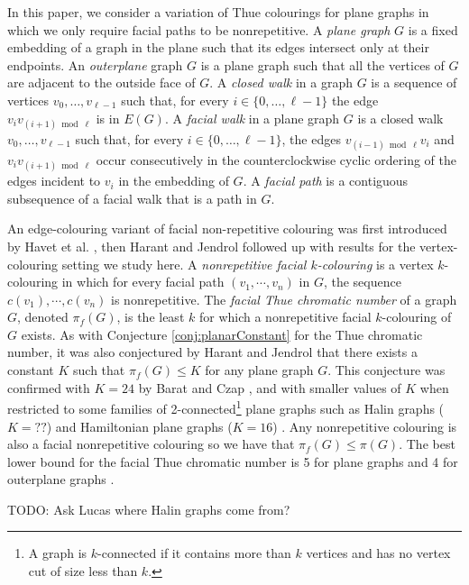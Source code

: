 \documentclass{patmorin}
\begin{document}
In this paper, we consider a variation of Thue colourings
for plane graphs in which we only require facial paths to be
nonrepetitive.
A \emph{plane graph} $G$ is a fixed embedding of a graph in the plane such that its edges intersect only at their endpoints. An \emph{outerplane} graph $G$ is a plane graph such that all the vertices of $G$ are adjacent to the outside face of $G$. 
A \emph{closed walk} in a graph $G$ is a sequence of vertices $v_0,\ldots,v_{\ell-1}$ such that, for every $i\in\{0,\ldots,\ell-1\}$ the edge $v_iv_{(i+1)\bmod \ell}$ is in $E(G)$.
A \emph{facial walk} in a plane graph $G$ is a closed walk
$v_0,\ldots,v_{\ell-1}$ such that, for every $i\in\{0,\ldots,\ell-1\}$,
the edges $v_{(i-1)\bmod \ell} v_i$ and $v_iv_{(i+1)\bmod\ell}$ occur
consecutively in the counterclockwise cyclic ordering of the edges
incident to $v_i$ in the embedding of $G$.
A \emph{facial path} is a contiguous subsequence of a facial walk that
is a path in $G$.
 


An edge-colouring variant of facial non-repetitive colouring was first introduced
by Havet et al. \cite{havet2011facial}, then Harant and Jendrol
\cite{harant2012nonrepetitive} followed up with results for the
vertex-colouring setting we study here. A 
\emph{nonrepetitive facial $k$-colouring} is a vertex
$k$-colouring in which for every facial path $(v_1,\cdots,v_n)$ in $G$,
the sequence $c(v_1),\cdots, c(v_n)$ is nonrepetitive. The \emph{facial
Thue chromatic number} of a graph $G$, denoted $\pi_f(G)$, is the least
$k$ for which a nonrepetitive facial $k$-colouring of $G$ exists. As with
Conjecture \ref{conj:planarConstant} for the Thue chromatic number, it
was also conjectured by Harant and Jendrol \cite{harant2012nonrepetitive}
that there exists a constant $K$ such that $\pi_f(G) \leq K$ for any plane
graph $G$. This conjecture was confirmed with $K=24$ by Barat and Czap
\cite{barat2013facial}, and with smaller values of $K$ when restricted
to some families of 2-connected\footnote{A graph is $k$-connected if
it contains more than $k$ vertices and has no vertex cut of size less
than $k$.} plane graphs such as Halin graphs ($K=??$) and Hamiltonian plane
graphs ($K=16$) \cite{harant2012nonrepetitive}. Any nonrepetitive colouring is
also a facial nonrepetitive colouring so we have that $\pi_f(G) \leq
\pi(G)$. The best lower bound for the facial Thue chromatic number is
5 for plane graphs and 4 for outerplane graphs \cite{barat2013facial}.


TODO: Ask Lucas where Halin graphs come from?
\end{document}
